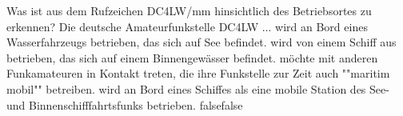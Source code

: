     {Was ist aus dem Rufzeichen DC4LW/mm hinsichtlich des Betriebsortes zu erkennen? Die deutsche Amateurfunkstelle DC4LW ...}
    {wird an Bord eines Wasserfahrzeugs betrieben, das sich auf See befindet.}
    {wird von einem Schiff aus betrieben, das sich auf einem Binnengewässer befindet.}
    {möchte mit anderen Funkamateuren in Kontakt treten, die ihre Funkstelle zur Zeit auch ""maritim mobil"" betreiben.}
    {wird an Bord eines Schiffes als eine mobile Station des See- und Binnenschifffahrtsfunks betrieben.}
    {false}{false}